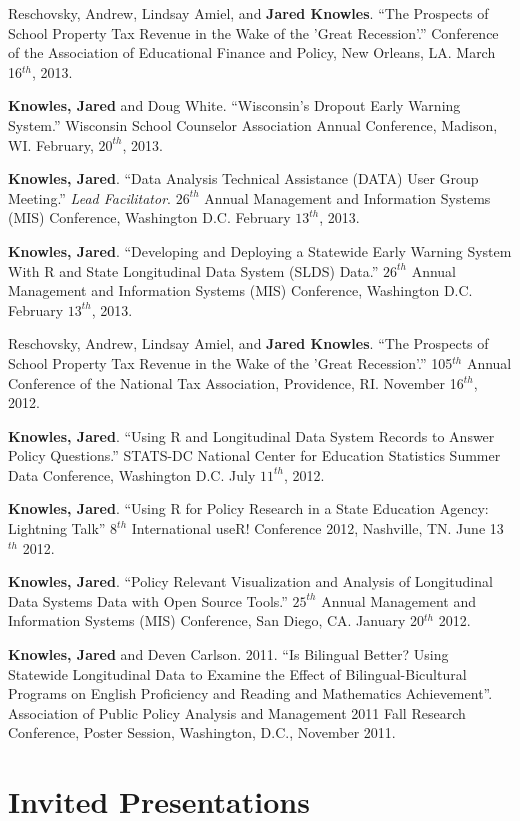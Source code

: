 \documentclass[margin,line]{res}
\begin{document}
\begin{resume}
Reschovsky, Andrew, Lindsay Amiel, and \textbf{Jared Knowles}. ``The Prospects of School Property Tax Revenue in the Wake of the 'Great Recession'.'' Conference of the Association of Educational Finance and Policy, New Orleans, LA. March 16$^{th}$, 2013. 

\textbf{Knowles, Jared} and Doug White. ``Wisconsin's Dropout Early Warning System.'' Wisconsin School Counselor Association Annual Conference, Madison, WI. February, $20^{th}$, 2013. 

\textbf{Knowles, Jared}. ``Data Analysis Technical Assistance (DATA) User Group Meeting.'' \emph{Lead Facilitator}. $26^{th}$ Annual Management and Information Systems (MIS) Conference, Washington D.C. February $13^{th}$, 2013.

\textbf{Knowles, Jared}. ``Developing and Deploying a Statewide Early Warning System With R and State Longitudinal Data System (SLDS) Data.'' $26^{th}$ Annual Management and Information Systems (MIS) Conference, Washington D.C. February $13^{th}$, 2013.

Reschovsky, Andrew, Lindsay Amiel, and \textbf{Jared Knowles}. ``The Prospects of School Property Tax Revenue in the Wake of the 'Great Recession'.'' 105$^{th}$ Annual Conference of the National Tax Association, Providence, RI. November 16$^{th}$, 2012. 

\textbf{Knowles, Jared}. ``Using R and Longitudinal Data System Records to Answer Policy Questions.'' STATS-DC National Center for Education Statistics Summer Data Conference, Washington D.C. July $11^{th}$, 2012.

\textbf{Knowles, Jared}. ``Using R for Policy Research in a State Education Agency: Lightning Talk'' $8^{th}$ International useR! Conference 2012, Nashville, TN. June 13$^{th}$ 2012.

\textbf{Knowles, Jared}. ``Policy Relevant Visualization and Analysis of Longitudinal Data Systems Data with Open Source Tools.'' $25^{th}$ Annual Management and Information Systems (MIS) Conference, San Diego, CA. January 20$^{th}$ 2012.

\textbf{Knowles, Jared} and Deven Carlson. 2011. ``Is Bilingual Better? Using Statewide Longitudinal Data to Examine the Effect of Bilingual-Bicultural Programs on English Proficiency and Reading and Mathematics Achievement''. Association of Public Policy Analysis and Management 2011 Fall Research Conference, Poster Session, Washington, D.C., November 2011.

\section{\sc Invited Presentations}


\end{resume}
\end{document}
